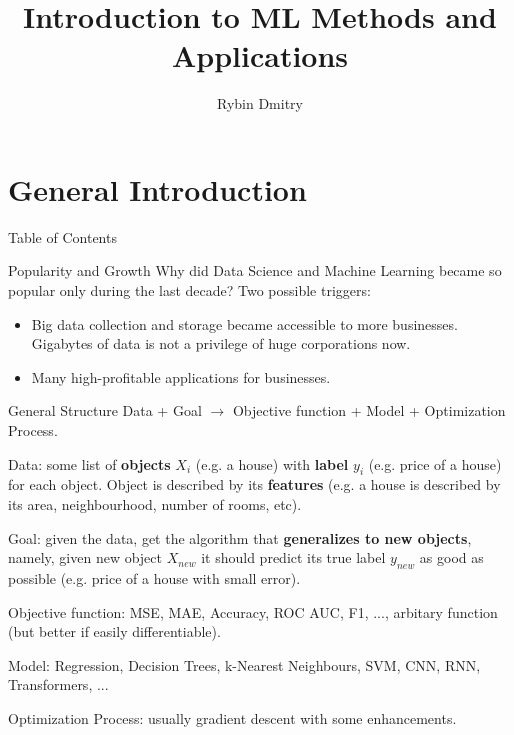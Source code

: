 \documentclass{beamer}
\title[ML Methods]{Introduction to ML Methods and Applications}
\author{Rybin Dmitry}
\institute[Higher School of Economics]
\theoremstyle{remark}
\begin{document}
\begin{frame}
\titlepage 
\end{frame}

\section{General Introduction}

\begin{frame}{Table of Contents}
    \tableofcontents[currentsection]
\end{frame}

\begin{frame}{Popularity and Growth}
    Why did Data Science and Machine Learning became so popular only during the last decade? Two possible triggers:
    \begin{itemize}
        \item Big data collection and storage became accessible to more businesses. Gigabytes of data is not a privilege of huge corporations now.
        \item Many high-profitable applications for businesses.
    \end{itemize}
\end{frame}

\begin{frame}{General Structure}
    Data + Goal $\to$ Objective function + Model + Optimization Process.\vspace{0.2in}
    
    Data: some list of \textbf{objects} $X_i$ (e.g. a house) with \textbf{label} $y_i$ (e.g. price of a house) for each object. Object is described by its \textbf{features} (e.g. a house is described by its area, neighbourhood, number of rooms, etc).\vspace{0.1in}
    
    Goal: given the data, get the algorithm that \textbf{generalizes to new objects}, namely, given new object $X_{new}$ it should predict its true label $y_{new}$ as good as possible (e.g. price of a house with small error).\vspace{0.1in}
    
    Objective function: MSE, MAE, Accuracy, ROC AUC, F1, ..., arbitary function (but better if easily differentiable).\vspace{0.1in}
    
    Model: Regression, Decision Trees, k-Nearest Neighbours, SVM, CNN, RNN, Transformers, ...\vspace{0.1in}
    
    Optimization Process: usually gradient descent with some enhancements.
\end{frame}
\end{document}
